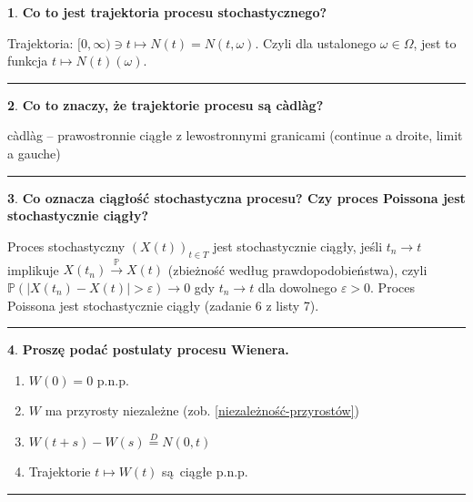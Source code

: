 \documentclass[
    twocolumn,
    twoside,
    fontsize=11pt,
    paper=A0,
    DIV=30
]{scrartcl}
\theoremstyle{definition}
\newtheorem{pytanie}{}
\theoremstyle{break}
\newenvironment{odpowiedź}{\vspace{-0.7em}}{\vspace{0.3em}\hrule}
\begin{document}
\begin{pytanie}
\textbf{Co to jest trajektoria procesu stochastycznego?}
\end{pytanie}
\begin{odpowiedź}
    Trajektoria: $[0, \infty) \ni t \mapsto N(t) = N(t, \omega)$.
    Czyli dla ustalonego $\omega \in \Omega$, jest to funkcja
    $t \mapsto N(t)(\omega)$.
\end{odpowiedź}


\begin{pytanie}
\textbf{Co to znaczy, że trajektorie procesu są càdlàg?}
\end{pytanie}
\begin{odpowiedź}\label{cadlag}
    càdlàg – prawostronnie ciągłe z lewostronnymi granicami
    (continue a droite, limit a gauche)
\end{odpowiedź}


\begin{pytanie}
\textbf{Co oznacza ciągłość stochastyczna procesu? Czy proces Poissona jest stochastycznie ciągły?}
\end{pytanie}
\begin{odpowiedź}
    Proces stochastyczny $(X(t))_{t \in T}$ jest stochastycznie
    ciągły, jeśli $t_n \to t$ implikuje $X(t_n) \overset {\mathbb{P}}\to X(t)$
    (zbieżność według prawdopodobieństwa), czyli
    $\mathbb{P}(|X(t_n) - X(t)| > \varepsilon) \to 0$ gdy $t_n \to t$ dla
    dowolnego $\varepsilon > 0$. Proces Poissona jest stochastycznie
    ciągły (zadanie 6 z listy 7).
\end{odpowiedź}


\begin{pytanie}
\textbf{Proszę podać postulaty procesu Wienera.}
\end{pytanie}
\begin{odpowiedź}
\begin{enumerate}
    \item $W(0) = 0$ p.n.p.
    \item $W$ ma przyrosty niezależne (zob. \ref{niezależność-przyrostów})
    \item $W(t+s) - W(s) \overset D = N(0, t)$
    \item Trajektorie $t \mapsto W(t)$ są ciągłe p.n.p.
\end{enumerate}
\end{odpowiedź}
\end{document}
